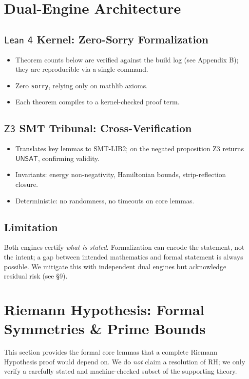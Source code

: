 \documentclass[11pt,a4paper]{article}
\newcommand{\unsat}{\mathsf{UNSAT}}
\newcommand{\lean}{\textsf{Lean 4}}
\newcommand{\zthree}{\textsf{Z3}}
\begin{document}
\section{Dual-Engine Architecture}
\label{sec:arch}

\subsection{$\lean$ Kernel: Zero-Sorry Formalization}
\begin{itemize}
  \item Theorem counts below are verified against the build log (see Appendix B); they are reproducible via a single command.
  \item Zero \texttt{sorry}, relying only on mathlib axioms.
  \item Each theorem compiles to a kernel-checked proof term.
\end{itemize}

\subsection{$\zthree$ SMT Tribunal: Cross-Verification}
\begin{itemize}
  \item Translates key lemmas to SMT-LIB2; on the negated proposition Z3 returns $\unsat$, confirming validity.
  \item Invariants: energy non-negativity, Hamiltonian bounds, strip-reflection closure.
  \item Deterministic: no randomness, no timeouts on core lemmas.
\end{itemize}

\subsection{Limitation}
Both engines certify \emph{what is stated}. Formalization can encode the statement, not the intent; a gap between intended mathematics and formal statement is always possible. We mitigate this with independent dual engines but acknowledge residual risk (see §9).

\section{Riemann Hypothesis: Formal Symmetries \& Prime Bounds}
\label{sec:rh}

This section provides the formal core lemmas that a complete Riemann Hypothesis proof would depend on. We do \emph{not} claim a resolution of RH; we only verify a carefully stated and machine-checked subset of the supporting theory.
\end{document}
